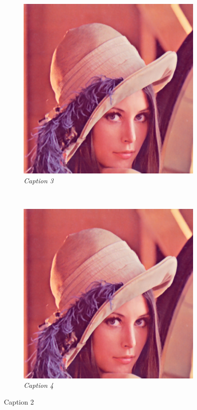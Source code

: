 \documentclass[11pt]{article}
\begin{document}
\begin{figure}[H]
    \begin{subfigure}[t]{0.5\textwidth}
        \centering
		\includegraphics[scale=.4]{figures/lena.png}
        \caption{\emph{Caption 3}}
    \end{subfigure}%
    ~
    \begin{subfigure}[t]{0.5\textwidth}
        \centering
        \includegraphics[scale=.4]{figures/lena.png}
		\caption{\emph{Caption 4}}
    \end{subfigure}%
    \caption{Caption 2}   
    \label{Label 2} 
\end{figure}




\hrulefill 
\end{document}
